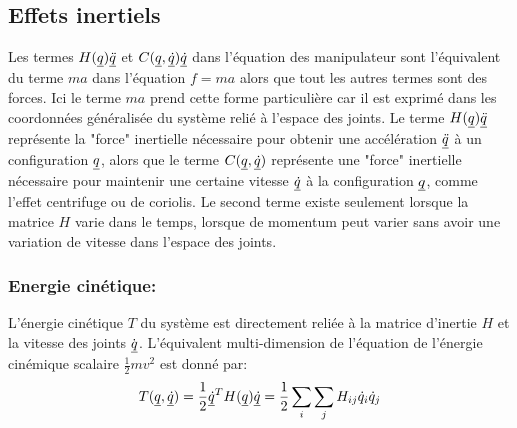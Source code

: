 \newpage
\subsection{Effets inertiels}
%

Les termes $H(\underline{q}) \underline{\ddot{q}}$ et $C(\underline{q},\underline{\dot{q}})\underline{\dot{q}}$ dans l'équation des manipulateur sont l'équivalent du terme $ma$ dans l'équation $f=ma$ alors que tout les autres termes sont des forces. Ici le terme $ma$ prend cette forme particulière car il est exprimé dans les coordonnées généralisée du système relié à l'espace des joints. Le terme $H(\underline{q}) \underline{\ddot{q}}$ représente la "force" inertielle nécessaire pour obtenir une accélération $\underline{\ddot{q}}$ à un configuration $\underline{q}$, alors que le terme $C(\underline{q},\underline{\dot{q}})$ représente une "force" inertielle nécessaire pour maintenir une certaine vitesse $\underline{\dot{q}}$ à la configuration $\underline{q}$, comme l'effet centrifuge ou de coriolis. Le second terme existe seulement lorsque la matrice $H$ varie dans le temps, lorsque de momentum peut varier sans avoir une variation de vitesse dans l'espace des joints. 

\subsubsection{Energie cinétique: }
L'énergie cinétique $T$ du système est directement reliée à la matrice d'inertie $H$ et la vitesse des joints $\dot{\underline{q}}$. L'équivalent multi-dimension de l'équation de l'énergie cinémique scalaire $\frac{1}{2}mv^2$ est donné par:
\begin{align}
T(\underline{q},\underline{\dot{q}}) = \frac{1}{2} \underline{\dot{q}}^T H(\underline{q}) \underline{\dot{q}}  =
\frac{1}{2} \sum_i \sum_j H_{ij} \dot{q}_i \dot{q}_j
\label{eq:kinetic}
\end{align}

